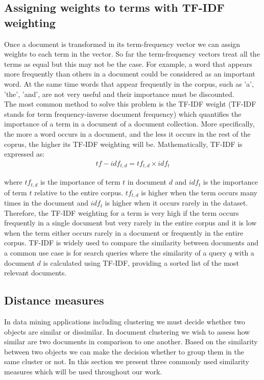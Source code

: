 \subsection{Assigning weights to terms with TF-IDF weighting}
Once a document is transformed in its term-frequency vector we can assign weights to each term in the vector. So far the term-frequency vectors treat 
all the terms as equal but this may not be the case. For example, a word that appears more frequently than others in a document could be considered as an 
important word. At the same time words that appear frequently in the corpus, such as 'a', 'the', 'and', are not very useful and their 
importance must be discounted. \\
The most common method to solve this problem is the TF-IDF weight (TF-IDF stands for term frequency-inverse document frequency) which quantifies the importance of a term in a document of a document collection. More specifically, the more a word occurs in a document, and the less it occurs in the rest of the coprus, the higher its TF-IDF weighting 
will be. Mathematically, TF-IDF is expressed as:\\
\begin{eqnarray}
tf-idf_{t,d} = tf_{t, d} \times idf_t
\end{eqnarray}

where $tf_{t, d}$ is the importance of term $t$ in document $d$ and $idf_t$ is the importance of term $t$ relative to the entire corpus. $tf_{t,d}$ is higher when the term occurs many times in the document and $idf_t$ is higher when it occurs rarely in the dataset. Therefore, the TF-IDF weighting for a term is very high if the term occurs frequently in a single document but very rarely in the entire corpus and it is low when the term either occurs rarely in a document or frequently in the entire corpus. TF-IDF is widely used to compare the similarity between documents and a common use case is for search queries where the similarity of a query $q$ with a document $d$ is calculated using TF-IDF, providing
a sorted list of the most relevant documents. 
\\

\subsection{Distance measures}
In data mining applications including clustering we must decide whether two objects are similar or dissimilar. In document clustering we wish to 
assess how similar are two documents in comparison to one another. Based on the similarity between two objects we can make the decision whether to
group them in the same cluster or not. In this section we present three commonly used similarity measures which will be used throughout our work. 

